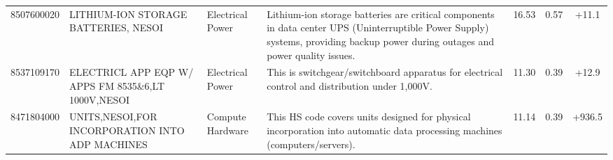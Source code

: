 \begin{landscape}
\begin{table}[htbp]
\begin{tabular}{lp{4cm}lp{6cm}ccc}
8507600020 & {\scriptsize LITHIUM-ION STORAGE BATTERIES, NESOI} & Electrical Power & {\scriptsize Lithium-ion storage batteries are critical components in data center UPS (Uninterruptible Power Supply) systems, providing backup power during outages and power quality issues.} & 16.53 & 0.57 & +11.1 \\
8537109170 & {\scriptsize ELECTRICL APP EQP W/ APPS FM 8535\&6,LT 1000V,NESOI} & Electrical Power & {\scriptsize This is switchgear/switchboard apparatus for electrical control and distribution under 1,000V.} & 11.30 & 0.39 & +12.9 \\
8471804000 & {\scriptsize UNITS,NESOI,FOR INCORPORATION INTO ADP MACHINES} & Compute Hardware & {\scriptsize This HS code covers units designed for physical incorporation into automatic data processing machines (computers/servers).} & 11.14 & 0.39 & +936.5 \\
\bottomrule
\end{tabular}
\end{table}
\end{landscape}
